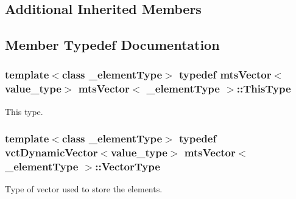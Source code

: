 \subsection*{Additional Inherited Members}


\subsection{Member Typedef Documentation}
\hypertarget{classmts_vector_a39c230cdeada331a65d94ee6790611e4}{
\subsubsection[{This\-Type}]{\setlength{\rightskip}{0pt plus 5cm}template$<$class \-\_\-element\-Type$>$ typedef {\bf mts\-Vector}$<$value\-\_\-type$>$ {\bf mts\-Vector}$<$ \-\_\-element\-Type $>$\-::{\bf This\-Type}}}\label{classmts_vector_a39c230cdeada331a65d94ee6790611e4}
This type. \hypertarget{classmts_vector_a49432bef14e2c0e3d4d9786d4e1093c7}{
\subsubsection[{Vector\-Type}]{\setlength{\rightskip}{0pt plus 5cm}template$<$class \-\_\-element\-Type$>$ typedef {\bf vct\-Dynamic\-Vector}$<$value\-\_\-type$>$ {\bf mts\-Vector}$<$ \-\_\-element\-Type $>$\-::{\bf Vector\-Type}}}\label{classmts_vector_a49432bef14e2c0e3d4d9786d4e1093c7}
Type of vector used to store the elements. 

